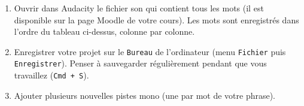 {\begin{enumerate}
\vspace{6pt}

\dotfill 

\vspace{6pt}

\dotfill 

\vspace{6pt}

\dotfill 

\vspace{6pt}

\dotfill 

\vspace{6pt}



\item Ouvrir dans Audacity le fichier son qui contient tous les mots (il est disponible sur la page Moodle de votre cours). Les mots sont enregistrés dans l'ordre du tableau ci-dessus, colonne par colonne.
\item Enregistrer votre projet sur le \texttt{Bureau} de l'ordinateur (menu \texttt{Fichier} puis \texttt{Enregistrer}). Penser à sauvegarder régulièrement pendant que vous travaillez (\texttt{Cmd + S}).   
\item Ajouter plusieurs nouvelles pistes mono (une par mot de votre phrase). 
\setcounter{tmp}{\value{enumi}}  
\end{enumerate}
} %

